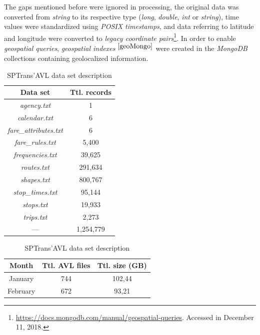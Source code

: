 \documentclass[runningheads]{llncs}
\newcommand{\footref}[1]{%
    $^{\ref{#1}}$%
}
\begin{document}
The gaps mentioned before were ignored in processing, the original data was converted from \textit{string} to its respective type (\textit{long}, \textit {double}, \textit{int} or \textit{string}), time values were standardized using \textit{POSIX timestamps}, and data referring to latitude and longitude were converted to \textit {legacy coordinate pairs}\footnote {\label{geoMongo}\url {https://docs.mongodb.com/manual/geospatial-queries}. Accessed in December 11, 2018.}. In order to enable \textit{geospatial queries}, \textit{geospatial indexes}\footref{geoMongo} were created in the \textit{MongoDB} collections containing geolocalized information.

\begin{table}[!htb]
    \begin{minipage}{.45\linewidth}
      \caption{Data set and total records specified in SPTrans' GTFS}
      \centering
      \label {tab:gtfs}
\begin {tabular} {c | c}
\toprule
\textbf{Data set} & \textbf {Ttl. records} \\
\midrule
\textit{agency.txt} & 1 \\
\hline
\textit{calendar.txt} & 6 \\
\hline
\textit{fare\_attributes.txt} & 6 \\
\hline
\textit{fare\_rules.txt} & 5,400 \\
\hline
\textit{frequencies.txt} & 39,625 \\
\hline
\textit{routes.txt} & 291,634 \\
\hline
\textit{shapes.txt} & 800,767 \\
\hline
\textit{stop\_times.txt} & 95,144 \\
\hline
\textit{stops.txt} & 19,933 \\
\hline
\textit{trips.txt} & 2,273 \\
\midrule
{---} & 1,254,779 \\
\bottomrule
\end {tabular}
    \end{minipage}%
    \begin{minipage}{.45\linewidth}
      \centering
        \caption{SPTrans'AVL data set description}
        \label{tab:avlDataset}
\begin{tabular}{ c | c | c}
\toprule
\textbf{Month} & \textbf{Ttl. AVL files} & \textbf{Ttl. size (GB)}\\
\midrule
January & 744 & 102,44 \\
\hline
 February & 672 & 93,21 \\

\end{tabular}
\end{minipage}
\end{table}
\end{document}
